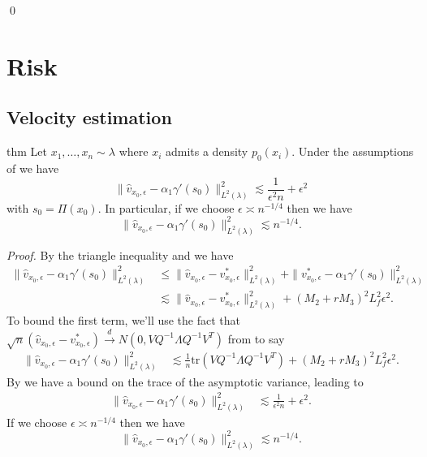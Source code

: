 \documentclass[11pt]{article}
\begin{document}
\qed{}

\section{Risk}
\subsection{Velocity estimation}
\begin{restatable}{thm}{} \label{thm: velocity risk}
    Let $x_1, \dots, x_n \sim \lambda$ where $x_i$ admits a density $p_0(x_i)$. Under the assumptions of  we have
    \[\|\hat{v}_{x_0, \epsilon} - \alpha_1\gamma'(s_0)\|_{L^2(\lambda)}^2 \lesssim \frac{1}{\epsilon^2n} + \epsilon^2 \]
    with $s_0 = \Pi(x_0)$. In particular, if we choose $\epsilon \asymp n^{-1/4}$ then we have
    \[\|\hat{v}_{x_0, \epsilon} - \alpha_1\gamma'(s_0)\|_{L^2(\lambda)}^2 \lesssim n^{-1/4}. \]
\end{restatable}
\noindent \textit{Proof.} By the triangle inequality and  we have
\begin{align}
    \|\hat{v}_{x_0, \epsilon} - \alpha_1\gamma'(s_0)\|_{L^2(\lambda)}^2 &\leq \|\hat{v}_{x_0, \epsilon} - v^*_{x_0, \epsilon} \|_{L^2(\lambda)}^2 + \|v^*_{x_0, \epsilon}  - \alpha_1\gamma'(s_0)\|_{L^2(\lambda)}^2 \\
    &\lesssim  \|\hat{v}_{x_0, \epsilon} - v^*_{x_0, \epsilon} \|_{L^2(\lambda)}^2 + (M_2 + rM_3)^2L_f^2\epsilon^2.
\end{align}
To bound the first term, we'll use the fact that $\sqrt{n}(\hat{v}_{x_0, \epsilon} - v^*_{x_0, \epsilon}) \overset{d}{\rightarrow}N(0, VQ^{-1}\Lambda Q^{-1}V^T)$ from  to say
\begin{align}
    \|\hat{v}_{x_0, \epsilon} - \alpha_1\gamma'(s_0)\|_{L^2(\lambda)}^2
    &\lesssim  \frac{1}{n}\text{tr}\left( VQ^{-1}\Lambda Q^{-1}V^T\right) + (M_2 + rM_3)^2L_f^2\epsilon^2.
\end{align}
By  we have a bound on the trace of the asymptotic variance, leading to
\begin{align}
    \|\hat{v}_{x_0, \epsilon} - \alpha_1\gamma'(s_0)\|_{L^2(\lambda)}^2
    &\lesssim  \frac{1}{\epsilon^2n} + \epsilon^2.
\end{align}
If we choose $\epsilon \asymp n^{-1/4}$ then we have
\[\|\hat{v}_{x_0, \epsilon} - \alpha_1\gamma'(s_0)\|_{L^2(\lambda)}^2 \lesssim n^{-1/4}. \]
\end{document}
